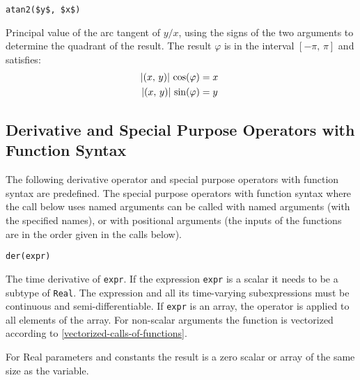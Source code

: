 \begin{operatordefinition}[atan2]
\begin{synopsis}\begin{lstlisting}
atan2($y$, $x$)
\end{lstlisting}\end{synopsis}
\begin{semantics}
Principal value of the arc tangent of $y/x$, using the signs of the two arguments to determine the quadrant of the result.  The result $\varphi$ is in the interval $\left[-\pi,\, \pi\right]$ and satisfies:
\begin{equation*}
\begin{aligned}
\abs{(x,\, y)}\, \cos(\varphi) &= x \\
\abs{(x,\, y)}\, \sin(\varphi) &= y
\end{aligned}
\end{equation*}
\end{semantics}
\end{operatordefinition}

\subsection{Derivative and Special Purpose Operators with Function Syntax}\label{derivative-and-special-purpose-operators-with-function-syntax}

The following derivative operator and special purpose operators with
function syntax are predefined. The special purpose operators with
function syntax where the call below uses named arguments can be called
with named arguments (with the specified names), or with positional
arguments (the inputs of the functions are in the order given in the
calls below).

\begin{operatordefinition}[der]
\begin{synopsis}\begin{lstlisting}
der(expr)
\end{lstlisting}\end{synopsis}
\begin{semantics}
The time derivative of \lstinline!expr!.  If the expression \lstinline!expr! is a scalar it needs to be a subtype of \lstinline!Real!.  The expression and all its time-varying subexpressions must be continuous and semi-differentiable.  If \lstinline!expr! is an array, the operator is applied to all elements of the array.  For non-scalar arguments the function is vectorized according to \cref{vectorized-calls-of-functions}.
\begin{nonnormative}
For Real parameters and constants the result is a zero scalar or array of the same size as the variable.
\end{nonnormative}
\end{semantics}
\end{operatordefinition}

